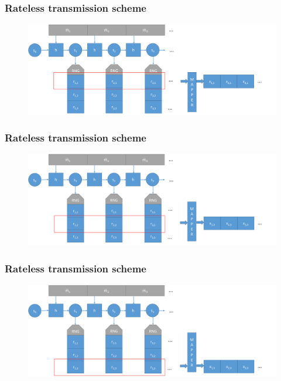\documentclass{beamer}
\begin{document}
\begin{frame}
\frametitle{Rateless transmission scheme}
\begin{figure}
\includegraphics[width=.99\textwidth]{Spinalcode5.pdf}
\end{figure}
\end{frame}
\begin{frame}
\frametitle{Rateless transmission scheme}
\begin{figure}
\includegraphics[width=.99\textwidth]{Spinalcode6.pdf}
\end{figure}
\end{frame}
\begin{frame}
\frametitle{Rateless transmission scheme}
\begin{figure}
\includegraphics[width=.99\textwidth]{Spinalcode7.pdf}
\end{figure}
\end{frame}
\end{document}
